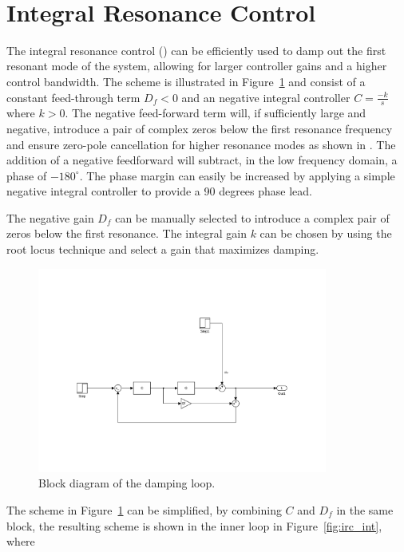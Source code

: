 \newpage~\newpage~
\FloatBarrier
\section{Integral Resonance Control}\label{sec:irc}
The integral resonance control (\abbrIRC) can be efficiently used to damp out the first resonant mode of the system, allowing for larger controller gains and a higher control bandwidth. The \abbrIRC scheme is illustrated in Figure~\ref{fig:irc} and consist of a constant feed-through term $D_f<0$ and an negative integral controller $C=\frac{-k}{s}$ where $k>0$. The negative feed-forward term will, if sufficiently large and negative, introduce a pair of complex zeros below the first resonance frequency and ensure zero-pole cancellation for higher resonance modes as shown in \citep{Aphale:2007}. The addition of a negative feedforward will subtract, in the low frequency domain, a phase of $-180^{\circ}$. The phase margin can easily be increased by applying a simple negative integral controller to provide a 90 degrees phase lead.

The negative gain $D_f$ can be manually selected to introduce a complex pair of zeros below the first resonance. The integral gain $k$ can be chosen by using the root locus technique and select a gain that maximizes damping.

\begin{figure}[h]
  \centering %
  \includegraphics[width=0.85\textwidth, trim=5.5cm 4cm 5.1cm 9.5cm, clip=true]{fig/matlab/irc}
  \caption{\label{fig:irc}Block diagram of the \abbrIRC damping loop.}
\end{figure}

The \abbrIRC scheme in Figure~\ref{fig:irc} can be simplified, by combining $C$ and $D_f$ in the same block, the resulting scheme is shown in the inner loop in Figure~\ref{fig:irc_int}, where

